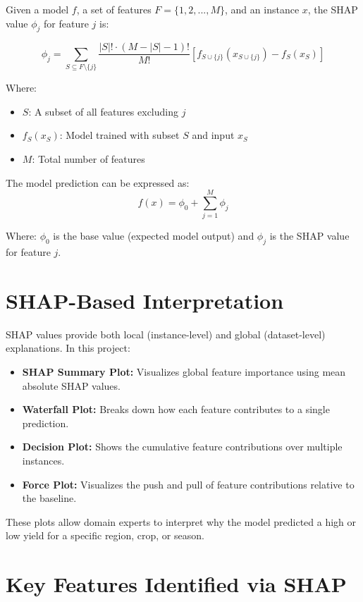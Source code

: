 \documentclass[a4paper,11pt,oneside]{book}
\begin{document}
Given a model \(f\), a set of features \(F = \{1, 2, ..., M\}\), and an instance \(x\), the SHAP value \(\phi_j\) for feature \(j\) is:

\[
\phi_j = \sum_{S \subseteq F \setminus \{j\}} \frac{|S|! \cdot (M - |S| - 1)!}{M!} \left[ f_{S \cup \{j\}}(x_{S \cup \{j\}}) - f_S(x_S) \right]
\]

Where:
\begin{itemize}
    \item \(S\): A subset of all features excluding \(j\)
    \item \(f_S(x_S)\): Model trained with subset \(S\) and input \(x_S\)
    \item \(M\): Total number of features
\end{itemize}

The model prediction can be expressed as:
\[
f(x) = \phi_0 + \sum_{j=1}^{M} \phi_j
\]

Where:
\(\phi_0\) is the base value (expected model output) and \(\phi_j\) is the SHAP value for feature \(j\).

\section{SHAP-Based Interpretation}

SHAP values provide both local (instance-level) and global (dataset-level) explanations. In this project:

\begin{itemize}
    \item \textbf{SHAP Summary Plot:} Visualizes global feature importance using mean absolute SHAP values.
    \item \textbf{Waterfall Plot:} Breaks down how each feature contributes to a single prediction.
    \item \textbf{Decision Plot:} Shows the cumulative feature contributions over multiple instances.
    \item \textbf{Force Plot:} Visualizes the push and pull of feature contributions relative to the baseline.
\end{itemize}

These plots allow domain experts to interpret why the model predicted a high or low yield for a specific region, crop, or season.

\section{Key Features Identified via SHAP}
\end{document}
